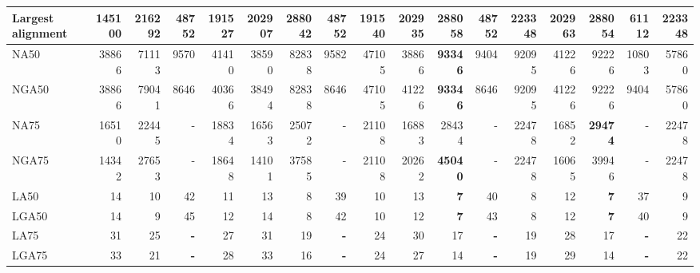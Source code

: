 \documentclass[12pt,a4paper]{article}
\begin{document}
\begin{table}[ht]
\begin{center}
\begin{tabular}{|l*{16}{|r}|}
Largest alignment & 145100 & 216292 & 48752 & 191527 & 202907 & 288042 & 48752 & 191540 & 202935 & {\bf 288058} & 48752 & 223348 & 202963 & 288054 & 61112 & 223348 \\ \hline
NA50 & 38866 & 71113 & 9570 & 41410 & 38590 & 82838 & 9582 & 47105 & 38866 & {\bf 93346} & 9404 & 92095 & 41226 & 92226 & 10803 & 57860 \\ \hline
NGA50 & 38866 & 79041 & 8646 & 40366 & 38494 & 82838 & 8646 & 47105 & 41226 & {\bf 93346} & 8646 & 92095 & 41226 & 92226 & 9404 & 57860 \\ \hline
NA75 & 16510 & 22445 & - & 18834 & 16563 & 25072 & - & 21108 & 16883 & 28434 & - & 22478 & 16852 & {\bf 29474} & - & 22478 \\ \hline
NGA75 & 14342 & 27653 & - & 18648 & 14101 & 37585 & - & 21108 & 20262 & {\bf 45040} & - & 22478 & 16065 & 39946 & - & 22478 \\ \hline
LA50 & 14 & 10 & 42 & 11 & 13 & 8 & 39 & 10 & 13 & {\bf 7} & 40 & 8 & 12 & {\bf 7} & 37 & 9 \\ \hline
LGA50 & 14 & 9 & 45 & 12 & 14 & 8 & 42 & 10 & 12 & {\bf 7} & 43 & 8 & 12 & {\bf 7} & 40 & 9 \\ \hline
LA75 & 31 & 25 & {\bf -} & 27 & 31 & 19 & {\bf -} & 24 & 30 & 17 & {\bf -} & 19 & 28 & 17 & {\bf -} & 22 \\ \hline
LGA75 & 33 & 21 & {\bf -} & 28 & 33 & 16 & {\bf -} & 24 & 27 & 14 & {\bf -} & 19 & 29 & 14 & {\bf -} & 22 \\ \hline
\end{tabular}
\end{center}
\end{table}
\end{document}

